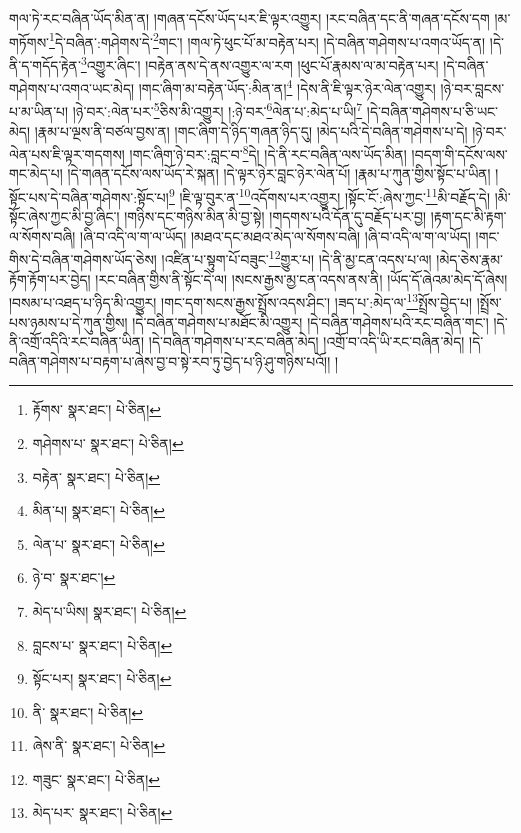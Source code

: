 གལ་ཏེ་རང་བཞིན་ཡོད་མིན་ན། །གཞན་དངོས་ཡོད་པར་ཇི་ལྟར་འགྱུར། །རང་བཞིན་དང་ནི་གཞན་དངོས་དག །མ་གཏོགས་\footnote{རྟོགས་  སྣར་ཐང་།  པེ་ཅིན། }དེ་བཞིན་:གཤེགས་དེ་\footnote{གཤེགས་པ་  སྣར་ཐང་།  པེ་ཅིན། }གང་། །གལ་ཏེ་ཕུང་པོ་མ་བརྟེན་པར། །དེ་བཞིན་གཤེགས་པ་འགའ་ཡོད་ན། །དེ་ནི་ད་གདོད་རྟེན་\footnote{བརྟེན་  སྣར་ཐང་།  པེ་ཅིན། }འགྱུར་ཞིང་། །བརྟེན་ནས་དེ་ནས་འགྱུར་ལ་རག །ཕུང་པོ་རྣམས་ལ་མ་བརྟེན་པར། །དེ་བཞིན་གཤེགས་པ་འགའ་ཡང་མེད། །གང་ཞིག་མ་བརྟེན་ཡོད་:མིན་ན།\footnote{མིན་པ།  སྣར་ཐང་།  པེ་ཅིན། } །དེས་ནི་ཇི་ལྟར་ཉེར་ལེན་འགྱུར། །ཉེ་བར་བླངས་པ་མ་ཡིན་པ། །ཉེ་བར་:ལེན་པར་\footnote{ལེན་པ་  སྣར་ཐང་།  པེ་ཅིན། }ཅིས་མི་འགྱུར། །:ཉེ་བར་\footnote{ཉེ་བ་  སྣར་ཐང་། }ལེན་པ་:མེད་པ་ཡི།\footnote{མེད་པ་ཡིས།  སྣར་ཐང་།  པེ་ཅིན། } །དེ་བཞིན་གཤེགས་པ་ཅི་ཡང་མེད། །རྣམ་པ་ལྔས་ནི་བཙལ་བྱས་ན། །གང་ཞིག་དེ་ཉིད་གཞན་ཉིད་དུ། །མེད་པའི་དེ་བཞིན་གཤེགས་པ་དེ། །ཉེ་བར་ལེན་པས་ཇི་ལྟར་གདགས། །གང་ཞིག་ཉེ་བར་:བླང་བ་\footnote{བླངས་པ་  སྣར་ཐང་།  པེ་ཅིན། }དེ། །དེ་ནི་རང་བཞིན་ལས་ཡོད་མིན། །བདག་གི་དངོས་ལས་གང་མེད་པ། །དེ་གཞན་དངོས་ལས་ཡོད་རེ་སྐན། །དེ་ལྟར་ཉེར་བླང་ཉེར་ལེན་པོ། །རྣམ་པ་ཀུན་གྱིས་སྟོང་པ་ཡིན། །སྟོང་པས་དེ་བཞིན་གཤེགས་:སྟོང་པ།\footnote{སྟོང་པར།  སྣར་ཐང་།  པེ་ཅིན། } །ཇི་ལྟ་བུར་ན་\footnote{ནི་  སྣར་ཐང་།  པེ་ཅིན། }འདོགས་པར་འགྱུར། །སྟོང་ངོ་:ཞེས་ཀྱང་\footnote{ཞེས་ནི་  སྣར་ཐང་།  པེ་ཅིན། }མི་བརྗོད་དེ། །མི་སྟོང་ཞེས་ཀྱང་མི་བྱ་ཞིང་། །གཉིས་དང་གཉིས་མིན་མི་བྱ་སྟེ། །གདགས་པའི་དོན་དུ་བརྗོད་པར་བྱ། །རྟག་དང་མི་རྟག་ལ་སོགས་བཞི། །ཞི་བ་འདི་ལ་ག་ལ་ཡོད། །མཐའ་དང་མཐའ་མེད་ལ་སོགས་བཞི། །ཞི་བ་འདི་ལ་ག་ལ་ཡོད། །གང་གིས་དེ་བཞིན་གཤེགས་ཡོད་ཅེས། །འཛིན་པ་སྟུག་པོ་བཟུང་\footnote{གཟུང་  སྣར་ཐང་།  པེ་ཅིན། }གྱུར་པ། །དེ་ནི་མྱ་ངན་འདས་པ་ལ། །མེད་ཅེས་རྣམ་རྟོག་རྟོག་པར་བྱེད། །རང་བཞིན་གྱིས་ནི་སྟོང་དེ་ལ། །སངས་རྒྱས་མྱ་ངན་འདས་ནས་ནི། །ཡོད་དོ་ཞེའམ་མེད་དོ་ཞེས། །བསམ་པ་འཐད་པ་ཉིད་མི་འགྱུར། །གང་དག་སངས་རྒྱས་སྤྲོས་འདས་ཤིང་། །ཟད་པ་:མེད་ལ་\footnote{མེད་པར་  སྣར་ཐང་།  པེ་ཅིན། }སྤྲོས་བྱེད་པ། །སྤྲོས་པས་ཉམས་པ་དེ་ཀུན་གྱིས། །དེ་བཞིན་གཤེགས་པ་མཐོང་མི་འགྱུར། །དེ་བཞིན་གཤེགས་པའི་རང་བཞིན་གང་། །དེ་ནི་འགྲོ་འདིའི་རང་བཞིན་ཡིན། །དེ་བཞིན་གཤེགས་པ་རང་བཞིན་མེད། །འགྲོ་བ་འདི་ཡི་རང་བཞིན་མེད། །དེ་བཞིན་གཤེགས་པ་བརྟག་པ་ཞེས་བྱ་བ་སྟེ་རབ་ཏུ་བྱེད་པ་ཉི་ཤུ་གཉིས་པའོ།། །
